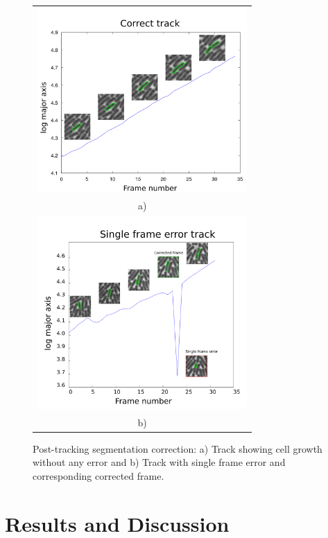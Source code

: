 \documentclass[journal]{IEEEtran}
\begin{document}
\begin{figure}[h]
	\begin{center}
		\begin{tabular}{c}
			\includegraphics[width=8cm]{correcttrack.png}\\
			a)\\
			\includegraphics[width=8cm]{singleerrtrack.png}\\
			b)
		\end{tabular}
		\caption{Post-tracking segmentation correction: a) Track showing cell growth without any error and b) Track with single frame error and corresponding corrected frame.}\label{fig:track}
	\end{center}
\end{figure}


\section{Results and Discussion}
\end{document}
